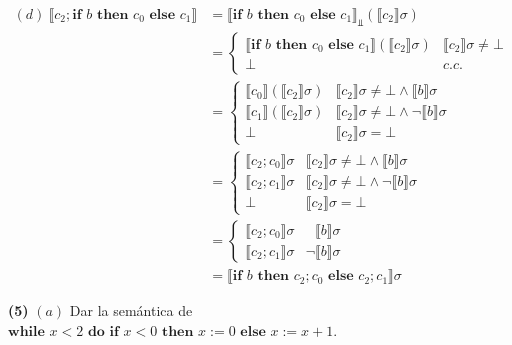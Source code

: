 \documentclass[a4paper, 12pt]{article}
\begin{document}
\begin{align*}
  (d) ~ \llbracket c_2;\textbf{if } b \textbf{ then } c_0 \textbf{ else } c_1 \rrbracket 
  &= \llbracket \textbf{if } b \textbf{ then } c_0 \textbf{ else } c_1
  \rrbracket_{\Bot} \left( \llbracket c_2 \rrbracket \sigma \right)  \\ 
  &= \begin{cases}
    \llbracket \textbf{if } b \textbf{ then } c_0 \textbf{ else } c_1 \rrbracket
    \left( \llbracket c_2 \rrbracket \sigma\right) & \llbracket c_2 \rrbracket
    \sigma \neq \bot  \\ 
    \bot & c.c.
  \end{cases} \\ 
  &= \begin{cases}
    \llbracket c_0 \rrbracket \left( \llbracket c_2 \rrbracket \sigma \right) &
    \llbracket c_2 \rrbracket \sigma \neq \bot \land \llbracket b \rrbracket
    \sigma \\
    \llbracket c_1 \rrbracket \left( \llbracket c_2 \rrbracket \sigma \right) &
    \llbracket c_2 \rrbracket \sigma \neq \bot \land \neg \llbracket b
    \rrbracket \sigma \\ 
    \bot  & \llbracket c_2 \rrbracket\sigma = \bot 
  \end{cases} \\ 
  &= \begin{cases}
    \llbracket c_2;c_0 \rrbracket \sigma &
    \llbracket c_2 \rrbracket \sigma \neq \bot \land \llbracket b \rrbracket
    \sigma \\
    \llbracket c_2;c_1 \rrbracket \sigma &
    \llbracket c_2 \rrbracket \sigma \neq \bot \land \neg \llbracket b
    \rrbracket \sigma \\ 
    \bot  & \llbracket c_2 \rrbracket\sigma = \bot 
  \end{cases} \\ 
  &=\begin{cases}
    \llbracket c_2;c_0 \rrbracket \sigma & ~~~\llbracket b \rrbracket \sigma \\ 
    \llbracket c_2;c_1 \rrbracket \sigma & \neg \llbracket b \rrbracket \sigma
  \end{cases} \\ 
  &= \llbracket \textbf{if } b \textbf{ then } c_2;c_0 \textbf{ else } c_2;c_1
  \rrbracket \sigma
\end{align*}

\pagebreak 

\begin{myframe}
\textbf{(5)} $(a)$ Dar la semántica de $\textbf{while } x < 2 \textbf{ do }  \textbf{if } x <
0\textbf{ then } x := 0 \textbf{ else } x := x + 1$. 
\end{myframe}
\end{document}
